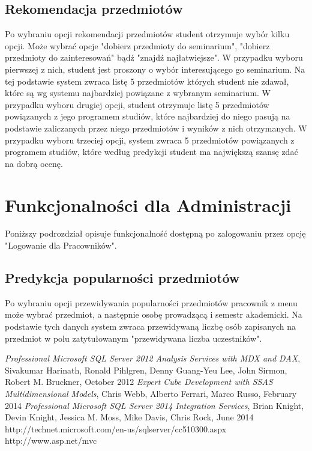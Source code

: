 \documentclass[licencjacka]{pracamgr}
\begin{document}
\subsection{Rekomendacja przedmiotów}
Po wybraniu opcji rekomendacji przedmiotów student otrzymuje wybór kilku opcji. Może wybrać opcje "dobierz przedmioty do seminarium", "dobierz przedmioty do zainteresowań" bądź "znajdź najłatwiejsze". W przypadku wyboru pierwszej z nich, student jest proszony o wybór interesującego go seminarium. Na tej podstawie system zwraca listę 5 przedmiotów których student nie zdawał, które są wg systemu najbardziej powiązane z wybranym seminarium. W przypadku wyboru drugiej opcji, student otrzymuje listę 5 przedmiotów powiązanych z jego programem studiów, które najbardziej do niego pasują na podstawie zaliczanych przez niego przedmiotów i wyników z nich otrzymanych. W przypadku wyboru trzeciej opcji, system zwraca 5 przedmiotów powiązanych z programem studiów, które według predykcji student ma największą szansę zdać na dobrą ocenę.

\section{Funkcjonalności dla Administracji}

Poniższy podrozdział opisuje funkcjonalność dostępną po zalogowaniu przez opcję "Logowanie dla Pracowników".

\subsection{Predykcja popularności przedmiotów}
Po wybraniu opcji przewidywania popularności przedmiotów pracownik z menu może wybrać przedmiot, a następnie osobę prowadzącą i semestr akademicki. Na podstawie tych danych system zwraca przewidywaną liczbę osób zapisanych na przedmiot w polu zatytułowanym "przewidywana liczba uczestników".

\begin{thebibliography}{99}
\emph{Professional Microsoft SQL Server 2012 Analysis Services with MDX and DAX},
Sivakumar Harinath, Ronald Pihlgren, Denny Guang-Yeu Lee, John Sirmon, Robert M. Bruckner,
October 2012
\emph{Expert Cube Development with SSAS Multidimensional Models},
Chris Webb, Alberto Ferrari, Marco Russo,
February 2014
\emph{Professional Microsoft SQL Server 2014 Integration Services},
Brian Knight, Devin Knight, Jessica M. Moss, Mike Davis, Chris Rock,
June 2014
http://technet.microsoft.com/en-us/sqlserver/cc510300.aspx
http://www.asp.net/mvc
\end{thebibliography}
\end{document}
